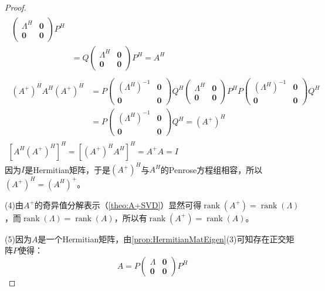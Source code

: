 \begin{proof}
\begin{gather*}
\begin{aligned}
\begin{pmatrix}
				\varLambda^H & \mathbf{0} \\
				\mathbf{0} & \mathbf{0}
			\end{pmatrix}
			P^H \\
			&=Q
			\begin{pmatrix}
				\varLambda^H & \mathbf{0} \\
				\mathbf{0} & \mathbf{0}
			\end{pmatrix}
			P^H
			=A^H
		\end{aligned} \\
		\begin{aligned}
			(A^+)^HA^H(A^+)^H
			&=P
			\begin{pmatrix}
				(\varLambda^H)^{-1} & \mathbf{0} \\
				\mathbf{0} & \mathbf{0}
			\end{pmatrix}
			Q^H\begin{pmatrix}
				\varLambda^H & \mathbf{0} \\
				\mathbf{0} & \mathbf{0}
			\end{pmatrix}
			P^HP
			\begin{pmatrix}
				(\varLambda^H)^{-1} & \mathbf{0} \\
				\mathbf{0} & \mathbf{0}
			\end{pmatrix}Q^H \\
			&=P
			\begin{pmatrix}
				(\varLambda^H)^{-1} & \mathbf{0} \\
				\mathbf{0} & \mathbf{0}
			\end{pmatrix}Q^H
			=(A^+)^H
		\end{aligned} \\
		[A^H(A^+)^H]^H=[(A^+)^HA^H]^H=A^+A=I
	\end{gather*}
	因为$I$是Hermitian矩阵，于是$(A^+)^H$与$A^H$的Penrose方程组相容，所以$(A^+)^H=(A^H)^+$。\par
	(4)由$A^+$的奇异值分解表示（\cref{theo:A+SVD}）显然可得$\operatorname{rank}(A^+)=\operatorname{rank}(\varLambda)$，而$\operatorname{rank}(\varLambda)=\operatorname{rank}(A)$，所以有$\operatorname{rank}(A^+)=\operatorname{rank}(A)$。\par
	(5)因为$A$是一个Hermitian矩阵，由\cref{prop:HermitianMatEigen}(3)可知存在正交矩阵$P$使得：
	\begin{equation*}
		A=P
		\begin{pmatrix}
			\varLambda & \mathbf{0} \\
			\mathbf{0} & \mathbf{0}
		\end{pmatrix}P^H
	\end{equation*}

\end{proof}
